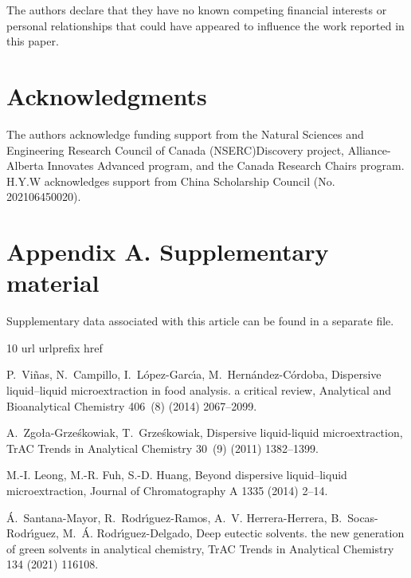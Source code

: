 \documentclass[a4paper,fleqn]{cas-dc}
\begin{document}
\begin{sloppypar}
The authors declare that they have no known competing financial interests or personal relationships that could have appeared to influence the work reported in this paper.

\section*{Acknowledgments}
The authors acknowledge funding support from the Natural Sciences and Engineering Research Council of Canada (NSERC)\textendash Discovery project, Alliance-Alberta Innovates Advanced program, and the Canada Research Chairs program. H.Y.W acknowledges support from China Scholarship Council (No. 202106450020).


\appendix
\section*{Appendix A. Supplementary material}

Supplementary data associated with this article can be found in a separate file. 



%
\begin{thebibliography}{10}
\expandafter\ifx\csname url\endcsname\relax
  \def\url#1{\texttt{#1}}\fi
\expandafter\ifx\csname urlprefix\endcsname\relax\def\urlprefix{URL }\fi
\expandafter\ifx\csname href\endcsname\relax
  \def\href#1#2{#2} \def\path#1{#1}\fi

P.~Vi{\~n}as, N.~Campillo, I.~L{\'o}pez-Garc{\'\i}a,
  M.~Hern{\'a}ndez-C{\'o}rdoba, Dispersive liquid--liquid microextraction in
  food analysis. a critical review, Analytical and Bioanalytical Chemistry
  406~(8) (2014) 2067--2099.

A.~Zgo{\l}a-Grze{\'s}kowiak, T.~Grze{\'s}kowiak, Dispersive liquid-liquid
  microextraction, TrAC Trends in Analytical Chemistry 30~(9) (2011)
  1382--1399.

M.-I. Leong, M.-R. Fuh, S.-D. Huang, Beyond dispersive liquid--liquid
  microextraction, Journal of Chromatography A 1335 (2014) 2--14.

{\'A}.~Santana-Mayor, R.~Rodr{\'\i}guez-Ramos, A.~V. Herrera-Herrera,
  B.~Socas-Rodr{\'\i}guez, M.~{\'A}. Rodr{\'\i}guez-Delgado, Deep eutectic
  solvents. the new generation of green solvents in analytical chemistry, TrAC
  Trends in Analytical Chemistry 134 (2021) 116108.


\end{thebibliography}
\end{sloppypar}
\end{document}

